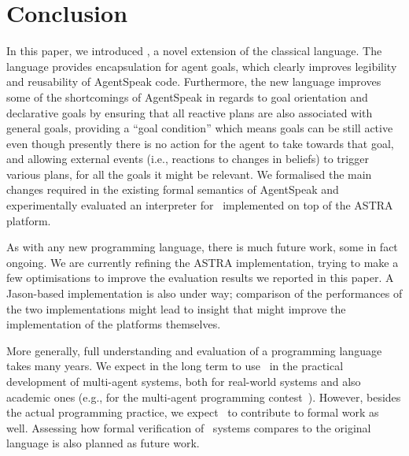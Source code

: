 \section{Conclusion}
\label{sec:conclusion}

In this paper, we introduced \aser, a novel extension of the classical
{\asl} language. The language provides encapsulation for agent
goals, which clearly improves legibility and reusability of AgentSpeak
code. Furthermore, the new language improves some of the shortcomings
of AgentSpeak in regards to goal orientation and declarative goals by
ensuring that all reactive plans are also associated with general
goals, providing a ``goal condition'' which means goals can be still
active even though presently there is no action for the agent to take
towards that goal, and allowing external events (i.e., reactions to
changes in beliefs) to trigger various plans, for all the goals it
might be relevant.  We formalised the main changes required in the
existing formal semantics of AgentSpeak and experimentally evaluated
an interpreter for \aser\ implemented on top of the ASTRA platform.

As with any new programming language, there is much future work, some
in fact ongoing. We are currently refining the ASTRA implementation,
trying to make a few optimisations to improve the evaluation results we
reported in this paper. A Jason-based implementation is also under
way; comparison of the performances of the two implementations might
lead to insight that might improve the implementation of the platforms
themselves. 

More generally, full understanding and evaluation of a programming
language takes many years. We expect in the long term to use \aser\ in
the practical development of multi-agent systems, both for real-world
systems and also academic ones (e.g., for the multi-agent programming
contest~\cite{Albrecht18}). However, besides the actual programming
practice, we expect \aser\ to contribute to formal work as
well. Assessing how formal verification of \aser\ systems compares to
the original language is also planned as future work.


